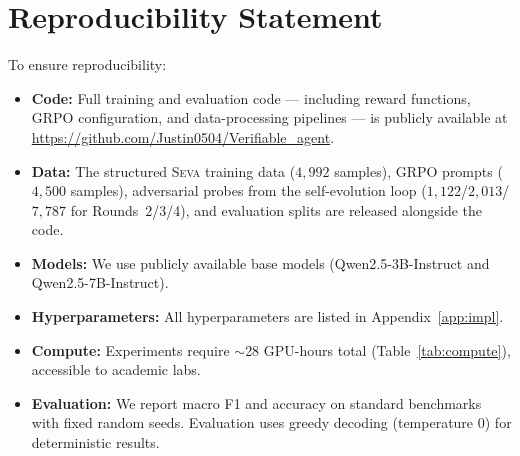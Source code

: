 \documentclass{article}
\newcommand{\seva}{\textsc{Seva}\xspace}
\begin{document}
\section*{Reproducibility Statement}

To ensure reproducibility:
\begin{itemize}[nosep,leftmargin=*]
\item \textbf{Code:} Full training and evaluation code --- including reward functions, GRPO configuration, and data-processing pipelines --- is publicly available at \url{https://github.com/Justin0504/Verifiable_agent}.
\item \textbf{Data:} The structured \seva training data ($4{,}992$ samples), GRPO prompts ($4{,}500$ samples), adversarial probes from the self-evolution loop ($1{,}122$/$2{,}013$/$7{,}787$ for Rounds~2/3/4), and evaluation splits are released alongside the code.
\item \textbf{Models:} We use publicly available base models (Qwen2.5-3B-Instruct and Qwen2.5-7B-Instruct).
\item \textbf{Hyperparameters:} All hyperparameters are listed in Appendix~\ref{app:impl}.
\item \textbf{Compute:} Experiments require $\sim$28 GPU-hours total (Table~\ref{tab:compute}), accessible to academic labs.
\item \textbf{Evaluation:} We report macro F1 and accuracy on standard benchmarks with fixed random seeds. Evaluation uses greedy decoding (temperature 0) for deterministic results.
\end{itemize}
\end{document}
